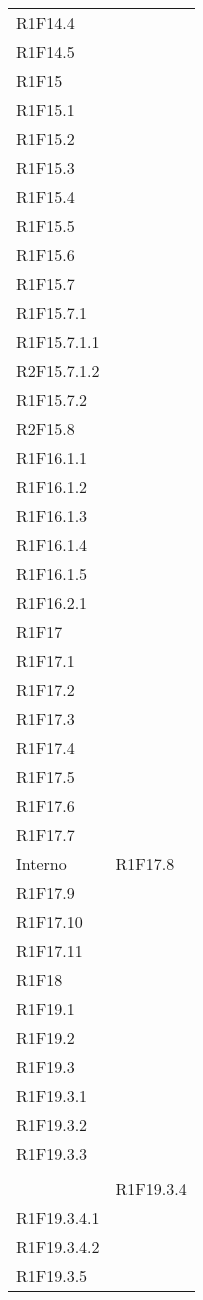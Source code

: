 \begin{longtable}{ >{\centering}p{}
			>{\centering}p{}}
		R1F14.4\\
		R1F14.5\\
		R1F15\\
		R1F15.1\\
		R1F15.2\\
		R1F15.3\\
		R1F15.4\\
		R1F15.5\\
		R1F15.6\\
		R1F15.7\\
		R1F15.7.1\\
		R1F15.7.1.1\\
		R2F15.7.1.2\\
		R1F15.7.2\\
		R2F15.8\\
		R1F16.1.1\\
		R1F16.1.2\\
		R1F16.1.3\\
		R1F16.1.4\\
		R1F16.1.5\\
		R1F16.2.1\\
		R1F17\\
		R1F17.1\\
		R1F17.2\\
		R1F17.3\\
		R1F17.4\\
		R1F17.5\\
		R1F17.6\\
		R1F17.7 \tabularnewline
		Interno	&
		R1F17.8\\
		R1F17.9\\
		R1F17.10\\
		R1F17.11\\
		R1F18\\
		R1F19.1\\
		R1F19.2\\
	
		R1F19.3\\
		R1F19.3.1\\
		R1F19.3.2\\
		R1F19.3.3
			\tabularnewline \rowcolorlight
		&
		\tabularnewline 
		&
		R1F19.3.4\\
		R1F19.3.4.1\\
		R1F19.3.4.2\\
		R1F19.3.5\\
		

\end{longtable}
